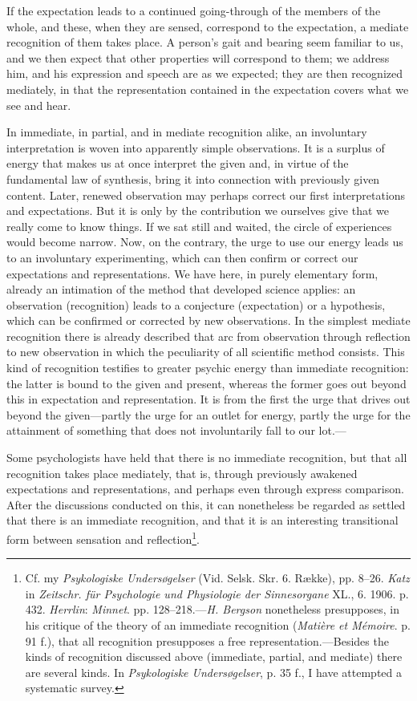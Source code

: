 \documentclass[12pt,a4paper]{book}
\newcommand{\opage}[1]{\marginnote{\footnotesize\textit{[#1]}}}
\begin{document}
If the expectation leads to a continued going-through of the members of
the whole, and these, when they are sensed, correspond to the expectation,
a mediate recognition of them takes place. A person's gait and bearing
seem familiar to us, and we then expect that other properties will
correspond to them; we address him, and his expression and speech are as
we expected; they are then recognized mediately, in that the
representation contained in the expectation covers what we see and hear.

\opage{51}In immediate, in partial, and in mediate recognition alike, an
involuntary interpretation is woven into apparently simple observations.
It is a surplus of energy that makes us at once interpret the given and,
in virtue of the fundamental law of synthesis, bring it into connection
with previously given content. Later, renewed observation may perhaps
correct our first interpretations and expectations. But it is only by the
contribution we ourselves give that we really come to know things. If we
sat still and waited, the circle of experiences would become narrow. Now,
on the contrary, the urge to use our energy leads us to an involuntary
experimenting, which can then confirm or correct our expectations and
representations. We have here, in purely elementary form, already an
intimation of the method that developed science applies: an observation
(recognition) leads to a conjecture (expectation) or a hypothesis, which
can be confirmed or corrected by new observations. In the simplest
mediate recognition there is already described that arc from observation
through reflection to new observation in which the peculiarity of all
scientific method consists. This kind of recognition testifies to greater
psychic energy than immediate recognition: the latter is bound to the
given and present, whereas the former goes out beyond this in expectation
and representation. It is from the first the urge that drives out beyond
the given---partly the urge for an outlet for energy, partly the urge for
the attainment of something that does not involuntarily fall to our lot.---

Some psychologists have held that there is no immediate recognition, but
that all recognition takes place mediately, that is, through previously
awakened expectations and representations, and perhaps even through
express comparison. After the discussions conducted on this, it can
nonetheless be regarded as settled that there is an immediate
recognition, and that it is an interesting transitional form between
sensation and reflection\footnote{Cf. my \emph{Psykologiske
Undersøgelser} (Vid. Selsk. Skr. 6. Række), pp. 8--26. \emph{Katz} in
\emph{Zeitschr. für Psychologie und Physiologie der Sinnesorgane} XL., 6.
1906. p. 432. \emph{Herrlin}: \emph{Minnet}. pp. 128--218.---\emph{H.
Bergson} nonetheless presupposes, in his critique of the theory of an
immediate recognition (\emph{Matière et Mémoire}. p. 91 f.), that all
recognition presupposes a free representation.---Besides the kinds of
recognition discussed above (immediate, partial, and mediate) there are
several kinds. In \emph{Psykologiske Undersøgelser}, p. 35 f., I have
attempted a systematic survey.}.
\end{document}
